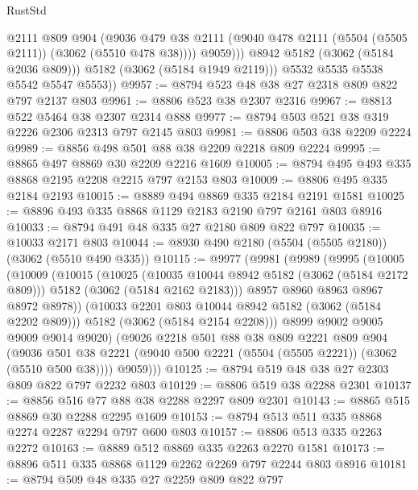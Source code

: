 \begin{lexlean}{RustStd}
\begin{coremodule}
                  @2111
                  @809
                  @904
                  (@9036
                    @479
                    @38
                    @2111
                    (@9040 @478 @2111 (@5504 (@5505 @2111)) (@3062 (@5510 @478 @38))))
                  @9059)))
            @8942
            @5182
            (@3062 (@5184 @2036 @809)))
          @5182
          (@3062 (@5184 @1949 @2119)))
        @5532
        @5535
        @5538
        @5542
        @5547
        @5553))
@9957 := @8794 @523 @48 @38 @27 @2318 @809 @822 @797 @2137 @803
@9961 := @8806 @523 @38 @2307 @2316
@9967 := @8813 @522 @5464 @38 @2307 @2314 @888
@9977 := @8794 @503 @521 @38 @319 @2226 @2306 @2313 @797 @2145 @803
@9981 := @8806 @503 @38 @2209 @2224
@9989 := @8856 @498 @501 @88 @38 @2209 @2218 @809 @2224
@9995 := @8865 @497 @8869 @30 @2209 @2216 @1609
@10005 := @8794 @495 @493 @335 @8868 @2195 @2208 @2215 @797 @2153 @803
@10009 := @8806 @495 @335 @2184 @2193
@10015 := @8889 @494 @8869 @335 @2184 @2191 @1581
@10025 := @8896 @493 @335 @8868 @1129 @2183 @2190 @797 @2161 @803 @8916
@10033 := @8794 @491 @48 @335 @27 @2180 @809 @822 @797
@10035 := @10033 @2171 @803
@10044 := @8930 @490 @2180 (@5504 (@5505 @2180)) (@3062 (@5510 @490 @335))
@10115 := @9977
    (@9981
      (@9989
        (@9995
          (@10005
            (@10009
              (@10015
                (@10025
                  (@10035 @10044 @8942 @5182 (@3062 (@5184 @2172 @809)))
                  @5182
                  (@3062 (@5184 @2162 @2183)))
                @8957
                @8960
                @8963
                @8967
                @8972
                @8978))
            (@10033 @2201 @803 @10044 @8942 @5182 (@3062 (@5184 @2202 @809)))
            @5182
            (@3062 (@5184 @2154 @2208)))
          @8999
          @9002
          @9005
          @9009
          @9014
          @9020)
        (@9026
          @2218
          @501
          @88
          @38
          @809
          @2221
          @809
          @904
          (@9036 @501 @38 @2221 (@9040 @500 @2221 (@5504 (@5505 @2221)) (@3062 (@5510 @500 @38))))
          @9059)))
@10125 := @8794 @519 @48 @38 @27 @2303 @809 @822 @797 @2232 @803
@10129 := @8806 @519 @38 @2288 @2301
@10137 := @8856 @516 @77 @88 @38 @2288 @2297 @809 @2301
@10143 := @8865 @515 @8869 @30 @2288 @2295 @1609
@10153 := @8794 @513 @511 @335 @8868 @2274 @2287 @2294 @797 @600 @803
@10157 := @8806 @513 @335 @2263 @2272
@10163 := @8889 @512 @8869 @335 @2263 @2270 @1581
@10173 := @8896 @511 @335 @8868 @1129 @2262 @2269 @797 @2244 @803 @8916
@10181 := @8794 @509 @48 @335 @27 @2259 @809 @822 @797

\end{coremodule}
\end{lexlean}
